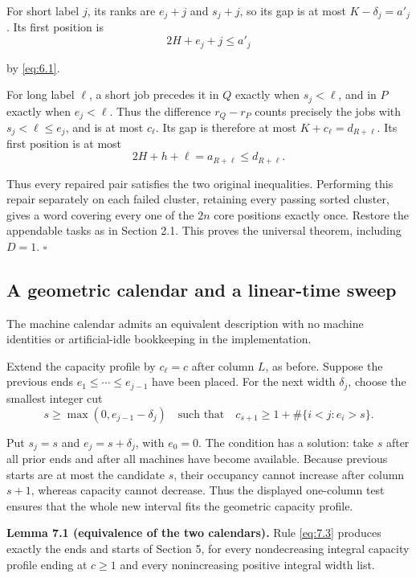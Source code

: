 \documentclass[11pt,a4paper]{article}
\begin{document}
For short label \(j\), its ranks are \(e_j+j\) and \(s_j+j\), so its gap is at most \(K-\delta_j=a'_j\). Its first position is
\[
2H+e_j+j\le a'_j
\]

by \eqref{eq:6.1}.

For long label \(\ell\), a short job precedes it in \(Q\) exactly when \(s_j<\ell\), and in \(P\) exactly when \(e_j<\ell\). Thus the difference \(r_Q-r_P\) counts precisely the jobs with \(s_j<\ell\le e_j\), and is at most \(c_\ell\). Its gap is therefore at most \(K+c_\ell=d_{R+\ell}\). Its first position is at most
\[
2H+h+\ell=a_{R+\ell}\le d_{R+\ell}.
\]

Thus every repaired pair satisfies the two original inequalities. Performing this repair separately on each failed cluster, retaining every passing sorted cluster, gives a word covering every one of the \(2n\) core positions exactly once. Restore the appendable tasks as in Section 2.1. This proves the universal theorem, including \(D=1\). \(\square\)

\hypertarget{a-geometric-calendar-and-a-linear-time-sweep}{%
\subsection{A geometric calendar and a linear-time sweep}\label{a-geometric-calendar-and-a-linear-time-sweep}}

The machine calendar admits an equivalent description with no machine identities or artificial-idle bookkeeping in the implementation.

Extend the capacity profile by \(c_\ell=c\) after column \(L\), as before. Suppose the previous ends \(e_1\le\cdots\le e_{j-1}\) have been placed. For the next width \(\delta_j\), choose the smallest integer cut
\begin{equation}
s\ge\max(0,e_{j-1}-\delta_j)
\quad\text{such that}\quad
c_{s+1}\ge1+\#\{i<j:e_i>s\}.
\tag{7.3}
\label{eq:7.3}
\end{equation}

Put \(s_j=s\) and \(e_j=s+\delta_j\), with \(e_0=0\). The condition has a solution: take \(s\) after all prior ends and after all machines have become available. Because previous starts are at most the candidate \(s\), their occupancy cannot increase after column \(s+1\), whereas capacity cannot decrease. Thus the displayed one-column test ensures that the whole new interval fits the geometric capacity profile.

\textbf{Lemma 7.1 (equivalence of the two calendars).} Rule \eqref{eq:7.3} produces exactly the ends and starts of Section 5, for every nondecreasing integral capacity profile ending at \(c\ge1\) and every nonincreasing positive integral width list.
\end{document}
